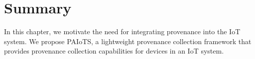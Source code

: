 \section{Summary}
In this chapter, we motivate the need for integrating provenance into the IoT system. 
We propose PAIoTS, a lightweight provenance collection framework that provides provenance collection capabilities for devices in an IoT system. 



%
